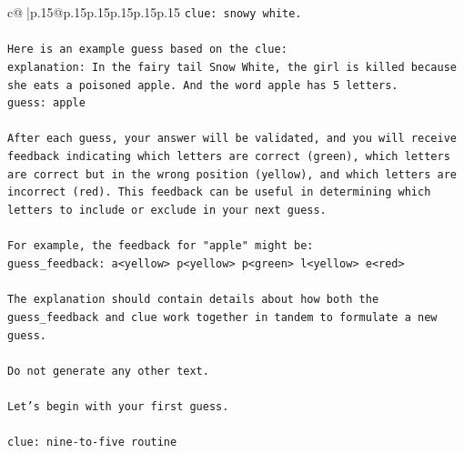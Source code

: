 \documentclass{article}
\begin{document}
{\begin{supertabular}{c@{$\;$}|p{.15\linewidth}@{}p{.15\linewidth}p{.15\linewidth}p{.15\linewidth}p{.15\linewidth}p{.15\linewidth}}
{{{\texttt{clue: snowy white.} \\
\\ 
\texttt{Here is an example guess based on the clue:} \\
\texttt{explanation: In the fairy tail Snow White, the girl is killed because she eats a poisoned apple. And the word apple has 5 letters.} \\
\texttt{guess: apple} \\
\\ 
\texttt{After each guess, your answer will be validated, and you will receive feedback indicating which letters are correct (green), which letters are correct but in the wrong position (yellow), and which letters are incorrect (red). This feedback can be useful in determining which letters to include or exclude in your next guess.} \\
\\ 
\texttt{For example, the feedback for "apple" might be:} \\
\texttt{guess\_feedback: a<yellow> p<yellow> p<green> l<yellow> e<red>} \\
\\ 
\texttt{The explanation should contain details about how both the guess\_feedback and clue work together in tandem to formulate a new guess.} \\
\\ 
\texttt{Do not generate any other text.} \\
\\ 
\texttt{Let's begin with your first guess.} \\
\\ 
\texttt{clue: nine{-}to{-}five routine} \\
            }
        }
    }
     \\ \\


\end{supertabular}}
\end{document}
